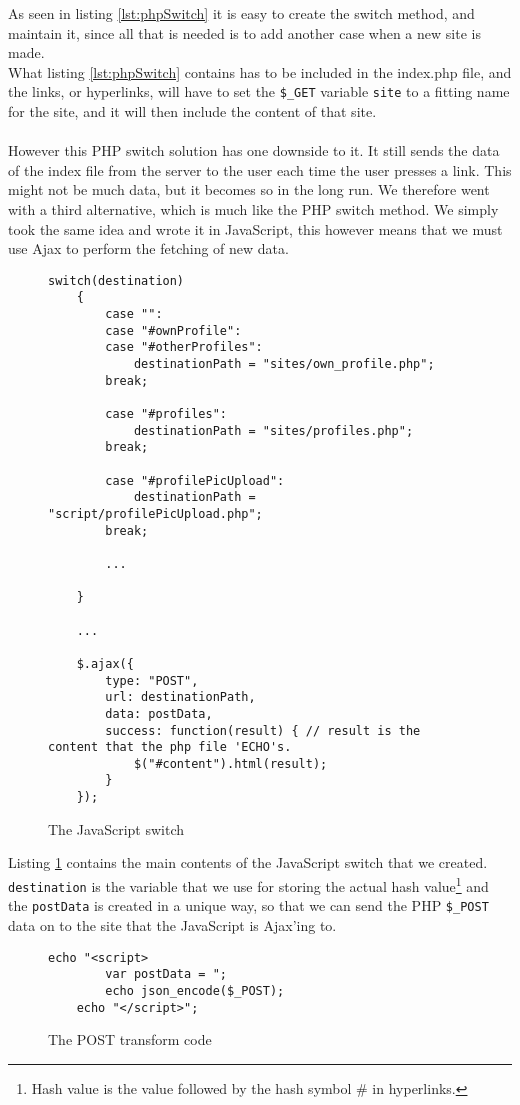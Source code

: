 As seen in listing \ref{lst:phpSwitch} it is easy to create the switch method, and maintain it, since all that is needed is to add another case when a new site is made.\\
What listing \ref{lst:phpSwitch} contains has to be included in the index.php file, and the links, or hyperlinks, will have to set the \texttt{\$\_GET} variable \texttt{site} to a fitting name for the site, and it will then include the content of that site.\\
\\
However this PHP switch solution has one downside to it. It still sends the data of the index file from the server to the user each time the user presses a link. This might not be much data, but it becomes so in the long run. We therefore went with a third alternative, which is much like the PHP switch method. We simply took the same idea and wrote it in JavaScript, this however means that we must use Ajax to perform the fetching of new data.\\
\lstset{language=Java}
\begin{figure}[htbp]
\begin{lstlisting}[firstline=1]
switch(destination)
	{
		case "":
		case "#ownProfile":
		case "#otherProfiles":
			destinationPath = "sites/own_profile.php";
		break;
		
		case "#profiles":
			destinationPath = "sites/profiles.php";
		break;
		
		case "#profilePicUpload":
			destinationPath = "script/profilePicUpload.php";
		break;
		
		...
		
	}
	
	...
	
	$.ajax({
		type: "POST",
		url: destinationPath,
		data: postData,
		success: function(result) { // result is the content that the php file 'ECHO's.
			$("#content").html(result);
		}
	});
\end{lstlisting}
\caption{The JavaScript switch}
\label{lst:javascriptSwitch}
\end{figure}

Listing \ref{lst:javascriptSwitch} contains the main contents of the JavaScript switch that we created. \texttt{destination} is the variable that we use for storing the actual hash value\footnote{Hash value is the value followed by the hash symbol \# in hyperlinks.} and the \texttt{postData} is created in a unique way, so that we can send the PHP \texttt{\$\_POST} data on to the site that the JavaScript is Ajax'ing to.\\
\lstset{language=PHP}
\begin{figure}[htbp]
\begin{lstlisting}[firstline=1]
	echo "<script>
		var postData = ";
		echo json_encode($_POST);
	echo "</script>";
\end{lstlisting}
\caption{The POST transform code}
\label{lst:postTransform}
\end{figure}

